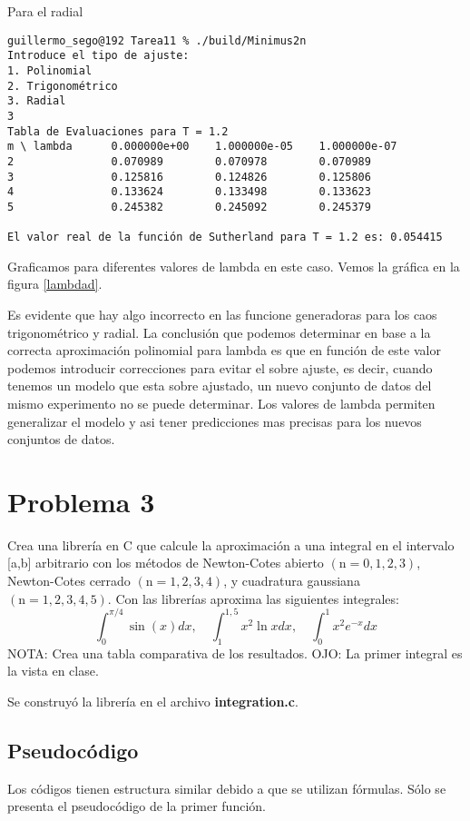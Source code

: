 \documentclass{article}
\begin{document}
Para el radial
\begin{lstlisting}
guillermo_sego@192 Tarea11 % ./build/Minimus2n
Introduce el tipo de ajuste:
1. Polinomial
2. Trigonométrico
3. Radial
3
Tabla de Evaluaciones para T = 1.2
m \ lambda      0.000000e+00    1.000000e-05    1.000000e-07
2               0.070989        0.070978        0.070989
3               0.125816        0.124826        0.125806
4               0.133624        0.133498        0.133623
5               0.245382        0.245092        0.245379

El valor real de la función de Sutherland para T = 1.2 es: 0.054415
\end{lstlisting}

Graficamos para diferentes valores de lambda en este caso. Vemos la gráfica en la figura \ref{lambdad}.

Es evidente que hay algo incorrecto en las funcione generadoras para los caos trigonométrico y radial. La conclusión que podemos determinar en base a la correcta aproximación polinomial para lambda es que en función de este valor podemos introducir correcciones para evitar el sobre ajuste, es decir, cuando tenemos un modelo que esta sobre ajustado, un nuevo conjunto de datos del mismo experimento no se puede determinar. Los valores de lambda permiten generalizar el modelo y asi tener predicciones mas precisas para los nuevos conjuntos de datos. 

\section{Problema 3}
Crea una librería en $\mathrm{C}$ que calcule la aproximación a una integral en el intervalo [a,b] arbitrario con los métodos de Newton-Cotes abierto $(\mathrm{n}=0,1,2,3)$, Newton-Cotes cerrado $(\mathrm{n}=1,2,3,4)$, y cuadratura gaussiana $(\mathrm{n}=1,2,3,4,5)$. Con las librerías aproxima las siguientes integrales:
\begin{equation*}
    \int_0^{\pi / 4} \sin (x) d x, \quad \int_1^{1,5} x^2 \ln x d x, \quad \int_0^1 x^2 e^{-x} d x
\end{equation*}
NOTA: Crea una tabla comparativa de los resultados. OJO: La primer integral es la vista en clase.

Se construyó la librería en el archivo \textbf{integration.c}. 

\subsection{Pseudocódigo}
Los códigos tienen estructura similar debido a que se utilizan fórmulas. Sólo se presenta el pseudocódigo de la primer función.
\end{document}
